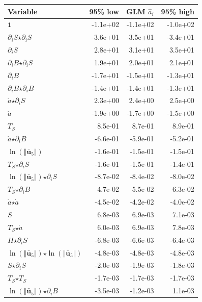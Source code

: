 \begin{table}[H]
\centering
\begin{tabular}{l|r|r|r}
  \textbf{Variable} & \textbf{95\% low} & \textbf{GLM} $\hat{a}_i$ & \textbf{95\% high} \\
  \hline
  $\mathbf{1}$ & -1.1e+02 & -1.1e+02 & -1.0e+02 \\
  $\partial_i S$$ \star $$\partial_i S$ & -3.6e+01 & -3.5e+01 & -3.4e+01 \\
  $\partial_i S$ & 2.8e+01 & 3.1e+01 & 3.5e+01 \\
  $\partial_i B$$ \star $$\partial_i S$ & 1.9e+01 & 2.0e+01 & 2.1e+01 \\
  $\partial_i B$ & -1.7e+01 & -1.5e+01 & -1.3e+01 \\
  $\partial_i B$$ \star $$\partial_i B$ & -1.4e+01 & -1.4e+01 & -1.3e+01 \\
  $\dot{a}$$ \star $$\partial_i S$ & 2.3e+00 & 2.4e+00 & 2.5e+00 \\
  $\dot{a}$ & -1.9e+00 & -1.7e+00 & -1.5e+00 \\
  $T_S$ & 8.5e-01 & 8.7e-01 & 8.9e-01 \\
  $\dot{a}$$ \star $$\partial_i B$ & -6.6e-01 & -5.9e-01 & -5.2e-01 \\
  $\ln\left( \Vert \bar{\mathbf{u}}_{5} \Vert \right)$ & -1.6e-01 & -1.5e-01 & -1.5e-01 \\
  $T_S$$ \star $$\partial_i S$ & -1.6e-01 & -1.5e-01 & -1.4e-01 \\
  $\ln\left( \Vert \bar{\mathbf{u}}_{5} \Vert \right)$$ \star $$\partial_i S$ & -8.7e-02 & -8.4e-02 & -8.0e-02 \\
  $T_S$$ \star $$\partial_i B$ & 4.7e-02 & 5.5e-02 & 6.3e-02 \\
  $\dot{a}$$ \star $$\dot{a}$ & -4.5e-02 & -4.2e-02 & -4.0e-02 \\
  $S$ & 6.8e-03 & 6.9e-03 & 7.1e-03 \\
  $T_S$$ \star $$\dot{a}$ & 6.0e-03 & 6.9e-03 & 7.8e-03 \\
  $H$$ \star $$\partial_i S$ & -6.8e-03 & -6.6e-03 & -6.4e-03 \\
  $\ln\left( \Vert \bar{\mathbf{u}}_{5} \Vert \right)$$ \star $$\ln\left( \Vert \bar{\mathbf{u}}_{5} \Vert \right)$ & -4.8e-03 & -4.8e-03 & -4.8e-03 \\
  $S$$ \star $$\partial_i S$ & -2.0e-03 & -1.9e-03 & -1.8e-03 \\
  $T_S$$ \star $$T_S$ & -1.7e-03 & -1.7e-03 & -1.7e-03 \\
  \color{red}$\ln\left( \Vert \bar{\mathbf{u}}_{5} \Vert \right)$$ \star $$\partial_i B$ & \color{red}-3.5e-03 & \color{red}-1.2e-03 & \color{red}1.1e-03 \\

\end{tabular}
\end{table}

